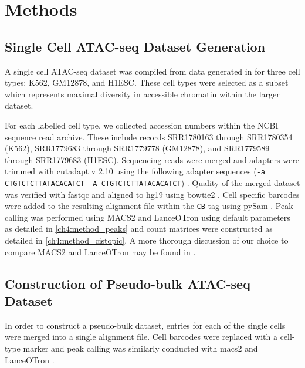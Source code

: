 
\section{Methods} \label{ch4:methods}


\subsection{Single Cell ATAC-seq Dataset Generation} \label{methods:sc_ds}

A single cell ATAC-seq dataset was compiled from data generated in \textcite{Buenrostro2015} for three cell types: K562, GM12878, and H1ESC. These cell types were selected as a subset which represents maximal diversity in accessible chromatin within the larger dataset. 

For each labelled cell type, we collected accession numbers within the NCBI sequence read archive. These include records SRR1780163 through SRR1780354 (K562), SRR1779683 through SRR1779778 (GM12878), and SRR1779589 through SRR1779683 (H1ESC). Sequencing reads were merged and adapters were trimmed with cutadapt v 2.10 using the following adapter sequences ({\tt -a CTGTCTCTTATACACATCT -A CTGTCTCTTATACACATCT}) \cite{Martin2011}. Quality of the merged dataset was verified with fastqc and aligned to hg19 using bowtie2 \cite{Andrews2010, Langmead2013}. Cell specific barcodes were added to the resulting alignment file within the {\tt CB} tag using pySam \cite{Heger2009}. Peak calling was performed using MACS2 and LanceOTron using default parameters \cite{Gaspar2018, Hentges2021} as detailed in \autoref{ch4:method_peaks} and count matrices were constructed as detailed in \autoref{ch4:method_cistopic}. A more thorough discussion of our choice to compare MACS2 and LanceOTron may be found in .

\subsection{Construction of Pseudo-bulk ATAC-seq Dataset}

In order to construct a pseudo-bulk dataset, entries for each of the single cells were merged into a single alignment file. Cell barcodes were replaced with a cell-type marker and peak calling was similarly conducted with macs2 and LanceOTron \cite{Gaspar2018, Hentges2021}.

